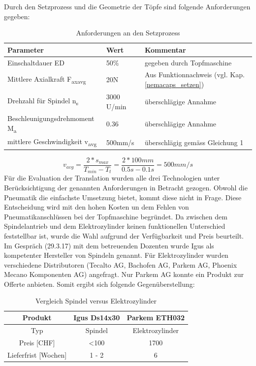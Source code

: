 Durch den Setzprozess und die Geometrie der Töpfe sind folgende Anforderungen gegeben:
\begin{table}[H]
\begin{tabular}{|l|l|l|}
	\hline 
	Parameter & Wert & Kommentar \\ 
	\hline 
	Einschaltdauer ED & 50\% & gegeben durch Topfmaschine \\ 
	\hline 
	Mittlere Axialkraft F\textsubscript{axavg} & 20N & Aus Funktionnachweis (vgl. Kap. \ref{nemacaps_setzen}) \\ 
	\hline 
	Drehzahl für Spindel n\textsubscript{s}& 3000 U/min & überschlägige Annahme \\ 
	\hline 
	Beschleunigungsdrehmoment M\textsubscript{a}& 0.36 & überschlägige Annahme \\ 
	\hline 
	mittlere Geschwindigkeit v\textsubscript{avg}& 500mm/s & überschlägig gemäss Gleichung 1\\ 
	\hline 
\end{tabular} 
\caption{Anforderungen an den Setzprozess}
\label{tab:annahmen_setzeinheit}
\end{table}
\begin{equation}
v_{avg}=\frac{2*s_{max}}{T_{min}-T_{t}}=\frac{2*100mm}{0.5s-0.1s}=500mm/s
\end{equation}
\newline
Für die Evaluation der Translation wurden alle drei Technologien unter Berücksichtigung der genannten Anforderungen in Betracht gezogen. Obwohl die Pneumatik die einfachste Umsetzung bietet, kommt diese nicht in Frage. Diese Entscheidung wird mit den hohen Kosten un dem Fehlen von Pneumatikanschlüssen bei der Topfmaschine begründet.
\newline
Da zwischen dem Spindelantrieb und dem Elektrozylinder keinen funktionellen Unterschied feststellbar ist, wurde die Wahl aufgrund der Verfügbarkeit und Preis beurteilt. Im Gespräch (29.3.17) mit dem betreuenden Dozenten wurde Igus als kompetenter Hersteller von Spindeln genannt. Für Elektrozylinder wurden verschiedene Distributoren (Tecalto AG, Bachofen AG, Parkem AG, Phoenix Mecano Komponenten AG) angefragt. Nur Parkem AG konnte ein Produkt zur Offerte anbieten. Somit ergibt sich folgende Gegenüberstellung:
\begin{table}[H]
\begin{tabular}{|c|c|c|}
	\hline 
	Produkt & Igus Ds14x30 & Parkem ETH032  \\ 
	\hline 
	Typ & Spindel & Elektrozylinder \\ 
	\hline 
	Preis [CHF] & <100  & 1700    \\ 
	\hline 
	Lieferfrist [Wochen] &1 - 2  &6 \\ 
	\hline 
\end{tabular}
	\vspace{0.2cm}
	\caption{Vergleich Spindel versus Elektrozylinder}
	\label{tab:spindelauslegung}
\end{table}
